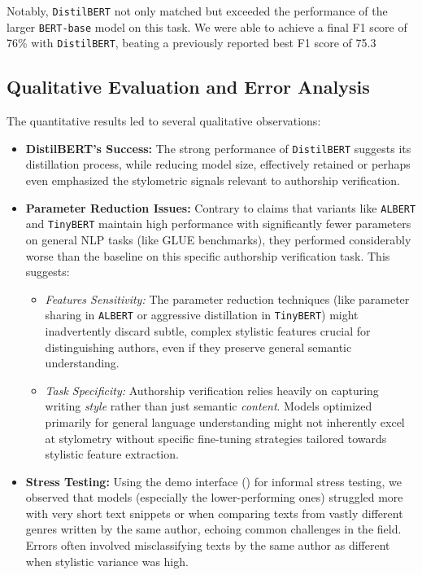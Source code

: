 \documentclass[12pt,a4paper]{article}
\begin{document}
Notably, \texttt{DistilBERT} not only matched but exceeded the performance of the larger \texttt{BERT-base} model on this task. We were able to achieve a final F1 score of 76\% with \texttt{DistilBERT}, beating a previously reported best F1 score of 75.3%

\subsection{Qualitative Evaluation and Error Analysis}
The quantitative results led to several qualitative observations:
\begin{itemize}
    \item \textbf{DistilBERT's Success:} The strong performance of \texttt{DistilBERT} suggests its distillation process, while reducing model size, effectively retained or perhaps even emphasized the stylometric signals relevant to authorship verification.
    \item \textbf{Parameter Reduction Issues:} Contrary to claims that variants like \texttt{ALBERT} and \texttt{TinyBERT} maintain high performance with significantly fewer parameters on general NLP tasks (like GLUE benchmarks), they performed considerably worse than the baseline on this specific authorship verification task. This suggests:
        \begin{itemize}
            \item \textit{Features Sensitivity:} The parameter reduction techniques (like parameter sharing in \texttt{ALBERT} or aggressive distillation in \texttt{TinyBERT}) might inadvertently discard subtle, complex stylistic features crucial for distinguishing authors, even if they preserve general semantic understanding.
            \item \textit{Task Specificity:} Authorship verification relies heavily on capturing writing \textit{style} rather than just semantic \textit{content}. Models optimized primarily for general language understanding might not inherently excel at stylometry without specific fine-tuning strategies tailored towards stylistic feature extraction.
\end{itemize}
    \item \textbf{Stress Testing:} Using the demo interface () for informal stress testing, we observed that models (especially the lower-performing ones) struggled more with very short text snippets or when comparing texts from vastly different genres written by the same author, echoing common challenges in the field. Errors often involved misclassifying texts by the same author as different when stylistic variance was high.
\end{itemize}
\end{document}
